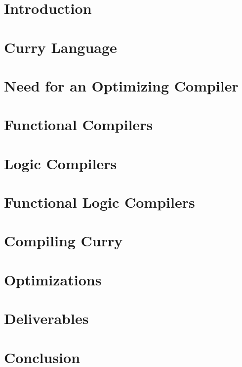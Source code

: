 \documentclass{article}
\begin{document}
\begin{abstract}
    
\end{abstract}

\section{Introduction}


\section{Curry Language}


\section{Need for an Optimizing Compiler}


\section{Functional Compilers}


\section{Logic Compilers}


\section{Functional Logic Compilers}


\section{Compiling Curry}


\section{Optimizations}


\section{Deliverables}


\section{Conclusion}





\end{document}
